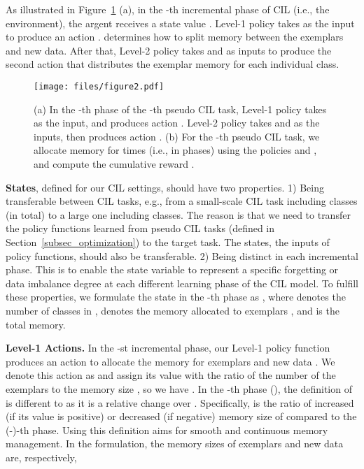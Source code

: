 \documentclass{article}
\newcommand{\myparagraph}[1]{\vspace{0.1em}\noindent\textbf{#1}}
\newcommand{\cotronlvsapce}{\vspace{0.0cm}}
\newcommand{\cotronlcaptionvsapce}{\vspace{0.0cm}}
\begin{document}
As illustrated in Figure~\ref{fig_2} (a), in the -th incremental phase of  CIL (i.e., the environment), the argent receives a state value .
Level-1 policy  takes  as the input to produce an action . 
 determines how to split memory between the exemplars and new data. 
After that, Level-2 policy  takes  and  as inputs to produce the second action  that distributes the exemplar memory for each individual class.

\begin{figure}[t]
\centering
\texttt{[image: files/figure2.pdf]}
\cotronlcaptionvsapce
\caption{(a) In the -th phase of the -th pseudo CIL task, Level-1 policy  takes  as the input, and produces action . Level-2 policy  takes  and  as the inputs, then produces action . 
(b) For the -th pseudo CIL task, we allocate memory for  times (i.e., in  phases) using the policies  and , and compute the cumulative reward .
}
\label{fig_2}
\cotronlvsapce
\end{figure} \myparagraph{States}, defined for our CIL settings, should have two properties. 1) Being transferable between CIL tasks, e.g., from a small-scale CIL task including  classes (in total) to a large one including  classes.
The reason is that we need to transfer the policy functions learned from pseudo CIL tasks (defined in Section~\ref{subsec_optimization}) to the target task. The states, the inputs of policy functions, should also be transferable.
2) Being distinct in each incremental phase.
This is to enable the state variable to represent a specific forgetting or data imbalance degree at each different learning phase of the CIL model.
To fulfill these properties, we formulate the state in the -th phase as 
, where  denotes the number of classes in ,  denotes the memory allocated to exemplars , and  is the total memory.


\myparagraph{Level-1 Actions.} In the -st incremental phase, our Level-1 policy function produces an action to allocate the memory for exemplars  and new data . We denote this action as  
and assign its value with the ratio of the number of the exemplars  to the memory size , so we have . In the -th phase (), 
the definition of  is different to  
as it is a relative change over . Specifically,  is the ratio of increased (if its value is positive) or decreased (if negative) memory size of  compared to the (-)-th phase. Using this definition aims for smooth and continuous memory management. In the formulation, the memory sizes of exemplars  and new data  are, respectively,
\end{document}
